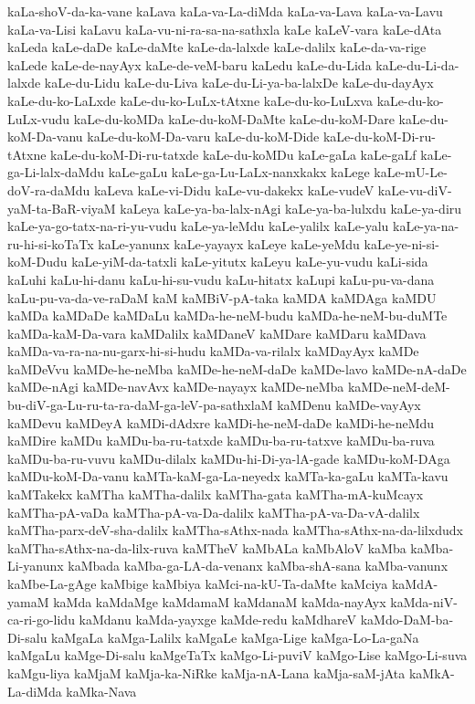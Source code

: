 {kaLa-shoV-da-ka-vane
kaLava
kaLa-va-La-diMda
kaLa-va-Lava
kaLa-va-Lavu
kaLa-va-Lisi
kaLavu
kaLa-vu-ni-ra-sa-na-sathxla
kaLe
kaLeV-vara
kaLe-dAta
kaLeda
kaLe-daDe
kaLe-daMte
kaLe-da-lalxde
kaLe-dalilx
kaLe-da-va-rige
kaLede
kaLe-de-nayAyx
kaLe-de-veM-baru
kaLedu
kaLe-du-Lida
kaLe-du-Li-da-lalxde
kaLe-du-Lidu
kaLe-du-Liva
kaLe-du-Li-ya-ba-lalxDe
kaLe-du-dayAyx
kaLe-du-ko-LaLxde
kaLe-du-ko-LuLx-tAtxne
kaLe-du-ko-LuLxva
kaLe-du-ko-LuLx-vudu
kaLe-du-koMDa
kaLe-du-koM-DaMte
kaLe-du-koM-Dare
kaLe-du-koM-Da-vanu
kaLe-du-koM-Da-varu
kaLe-du-koM-Dide
kaLe-du-koM-Di-ru-tAtxne
kaLe-du-koM-Di-ru-tatxde
kaLe-du-koMDu
kaLe-gaLa
kaLe-gaLf
kaLe-ga-Li-lalx-daMdu
kaLe-gaLu
kaLe-ga-Lu-LaLx-nanxkakx
kaLege
kaLe-mU-Le-doV-ra-daMdu
kaLeva
kaLe-vi-Didu
kaLe-vu-dakekx
kaLe-vudeV
kaLe-vu-diV-yaM-ta-BaR-viyaM
kaLeya
kaLe-ya-ba-lalx-nAgi
kaLe-ya-ba-lulxdu
kaLe-ya-diru
kaLe-ya-go-tatx-na-ri-yu-vudu
kaLe-ya-leMdu
kaLe-yalilx
kaLe-yalu
kaLe-ya-na-ru-hi-si-koTaTx
kaLe-yanunx
kaLe-yayayx
kaLeye
kaLe-yeMdu
kaLe-ye-ni-si-koM-Dudu
kaLe-yiM-da-tatxli
kaLe-yitutx
kaLeyu
kaLe-yu-vudu
kaLi-sida
kaLuhi
kaLu-hi-danu
kaLu-hi-su-vudu
kaLu-hitatx
kaLupi
kaLu-pu-va-dana
kaLu-pu-va-da-ve-raDaM
kaM
kaMBiV-pA-taka
kaMDA
kaMDAga
kaMDU
kaMDa
kaMDaDe
kaMDaLu
kaMDa-he-neM-budu
kaMDa-he-neM-bu-duMTe
kaMDa-kaM-Da-vara
kaMDalilx
kaMDaneV
kaMDare
kaMDaru
kaMDava
kaMDa-va-ra-na-nu-garx-hi-si-hudu
kaMDa-va-rilalx
kaMDayAyx
kaMDe
kaMDeVvu
kaMDe-he-neMba
kaMDe-he-neM-daDe
kaMDe-lavo
kaMDe-nA-daDe
kaMDe-nAgi
kaMDe-navAvx
kaMDe-nayayx
kaMDe-neMba
kaMDe-neM-deM-bu-diV-ga-Lu-ru-ta-ra-daM-ga-leV-pa-sathxlaM
kaMDenu
kaMDe-vayAyx
kaMDevu
kaMDeyA
kaMDi-dAdxre
kaMDi-he-neM-daDe
kaMDi-he-neMdu
kaMDire
kaMDu
kaMDu-ba-ru-tatxde
kaMDu-ba-ru-tatxve
kaMDu-ba-ruva
kaMDu-ba-ru-vuvu
kaMDu-dilalx
kaMDu-hi-Di-ya-lA-gade
kaMDu-koM-DAga
kaMDu-koM-Da-vanu
kaMTa-kaM-ga-La-neyedx
kaMTa-ka-gaLu
kaMTa-kavu
kaMTakekx
kaMTha
kaMTha-dalilx
kaMTha-gata
kaMTha-mA-kuMcayx
kaMTha-pA-vaDa
kaMTha-pA-va-Da-dalilx
kaMTha-pA-va-Da-vA-dalilx
kaMTha-parx-deV-sha-dalilx
kaMTha-sAthx-nada
kaMTha-sAthx-na-da-lilxdudx
kaMTha-sAthx-na-da-lilx-ruva
kaMTheV
kaMbALa
kaMbAloV
kaMba
kaMba-Li-yanunx
kaMbada
kaMba-ga-LA-da-venanx
kaMba-shA-sana
kaMba-vanunx
kaMbe-La-gAge
kaMbige
kaMbiya
kaMci-na-kU-Ta-daMte
kaMciya
kaMdA-yamaM
kaMda
kaMdaMge
kaMdamaM
kaMdanaM
kaMda-nayAyx
kaMda-niV-ca-ri-go-lidu
kaMdanu
kaMda-yayxge
kaMde-redu
kaMdhareV
kaMdo-DaM-ba-Di-salu
kaMgaLa
kaMga-Lalilx
kaMgaLe
kaMga-Lige
kaMga-Lo-La-gaNa
kaMgaLu
kaMge-Di-salu
kaMgeTaTx
kaMgo-Li-puviV
kaMgo-Lise
kaMgo-Li-suva
kaMgu-liya
kaMjaM
kaMja-ka-NiRke
kaMja-nA-Lana
kaMja-saM-jAta
kaMkA-La-diMda
kaMka-Nava
}
